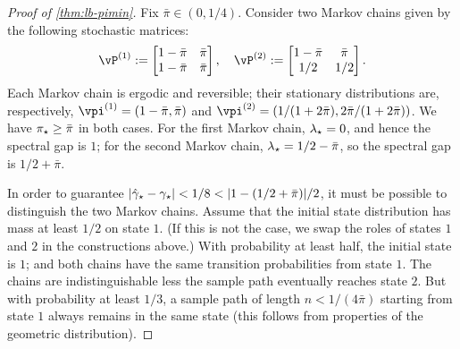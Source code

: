 
\begin{proof}[Proof of \cref{thm:lb-pimin}]
  Fix $\bar\pi \in (0,1/4)$.
  Consider two Markov chains given by the following stochastic
  matrices:
  \[
    \vP^{(1)} :=
    \begin{bmatrix}
      1-\bar\pi & \bar\pi \\
      1-\bar\pi & \bar\pi
    \end{bmatrix}
    , \quad
    \vP^{(2)} :=
    \begin{bmatrix}
      1-\bar\pi & \bar\pi \\
      1/2 & 1/2
    \end{bmatrix}
    .
  \]
  Each Markov chain is ergodic and reversible; their stationary
  distributions are, respectively, $\vpi^{(1)} = (1-\bar\pi,\bar\pi)$
  and $\vpi^{(2)} = (1/(1+2\bar\pi),2\bar\pi/(1+2\bar\pi))$.
  We have $\pi_{\star} \geq \bar\pi$ in both cases.
  For the first Markov chain, $\lambda_{\star} = 0$, and hence the spectral gap
  is $1$; for the second Markov chain, $\lambda_{\star} = 1/2-\bar\pi$, so the
  spectral gap is $1/2+\bar\pi$.

  In order to guarantee $|\hat\gamma_{\star} - \gamma_{\star}| < 1/8 < |1 -
  (1/2+\bar\pi)|/2$, it must be possible to distinguish the two Markov
  chains.
  Assume that the initial state distribution has mass at least $1/2$
  on state $1$.
  (If this is not the case, we swap the roles of states $1$ and $2$ in
  the constructions above.)
  With probability at least half, the initial state is $1$; and both
  chains have the same transition probabilities from state $1$.
  The chains are indistinguishable less the sample path eventually
  reaches state $2$.
  But with probability at least $1/3$, a sample path of length $n <
  1/(4\bar\pi)$ starting from state $1$ always remains in the same
  state (this follows from properties of the geometric distribution).
\end{proof}


